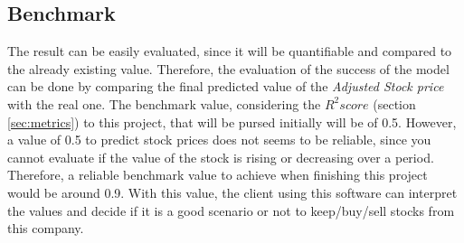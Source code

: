 \subsection{Benchmark}
\label{subsec:bench}
The result can be easily evaluated, since it will be quantifiable and compared to the already existing value. Therefore, the evaluation of the success of the model can be done by comparing the final
predicted value of the \emph{Adjusted Stock price} with the real one. The benchmark value, considering the $R^2 score$ (section \ref{sec:metrics}) to this project, that will be pursed initially will be of 0.5.
However, a value of 0.5 to predict stock prices does not seems to be reliable, since you cannot evaluate if the value of the stock is rising or decreasing over a period. 
Therefore, a reliable benchmark value to achieve when finishing this project would be around 0.9. With this value, the client using this software can interpret the values and decide if it is
a good scenario or not to keep/buy/sell stocks from this company.
\\